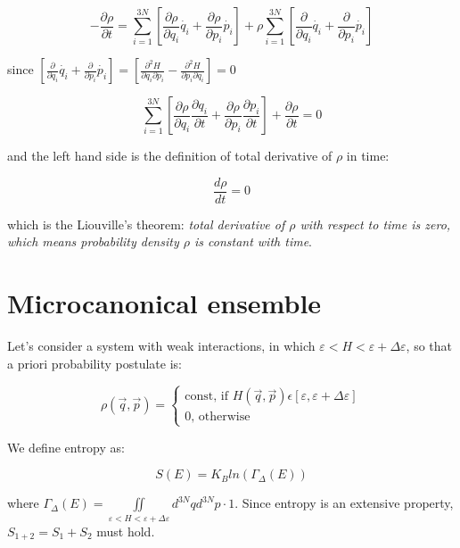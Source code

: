 \documentclass[a4paper, italian, openany]{book}
\begin{document}
$$-\frac{\partial \rho}{\partial t} = \sum_{i=1}^{3N} \left [ \frac{\partial \rho}{\partial q_i}\dot{q_i} + \frac{\partial \rho}{\partial p_i} \dot{p_i} \right ] + \rho \sum_{i=1}^{3N} \left [ \frac{\partial}{\partial q_i}\dot{q_i} + \frac{\partial}{\partial p_i} \dot{p_i} \right ]$$

since $\left [ \frac{\partial}{\partial q_i}\dot{q_i} + \frac{\partial}{\partial p_i} \dot{p_i} \right ] = \left [ \frac{\partial^2 H}{\partial q_i \partial p_i} - \frac{\partial^2 H}{\partial p_i \partial q_i} \right ] = 0$

$$\sum_{i=1}^{3N} \left [ \frac{\partial \rho}{\partial q_i} \frac{\partial q_i}{\partial t} + \frac{\partial \rho}{\partial p_i} \frac{\partial p_i}{\partial t} \right ] + \frac{\partial \rho}{\partial t} = 0$$

and the left hand side is the definition of total derivative of $\rho$ in time:

$$\frac{d\rho}{dt} = 0$$

which is the Liouville's theorem: \textit{total derivative of $\rho$ with respect to time is zero, which means probability density $\rho$ is constant with time}.

\section{Microcanonical ensemble}

Let's consider a system with weak interactions, in which $\varepsilon < H < \varepsilon + \Delta \varepsilon$, so that a priori probability postulate is:

$$\rho(\overrightarrow{q}, \overrightarrow{p}) = \begin{cases}\mbox{const} \mbox{,   if   } H(\overrightarrow{q}, \overrightarrow{p}) \epsilon \left [ \varepsilon , \varepsilon + \Delta \varepsilon \right ] \\ 0 \mbox{,   otherwise}\end{cases}$$

We define entropy as:

$$S(E) = K_B ln(\Gamma_\Delta(E))$$

where $\Gamma_\Delta(E) = \iint \limits_{\varepsilon < H < \varepsilon + \Delta \varepsilon} d^{3N}q d^{3N}p \cdot 1$.\newline 
Since entropy is an extensive property,  $S_{1+2} = S_1 + S_2$ must hold.
\end{document}
